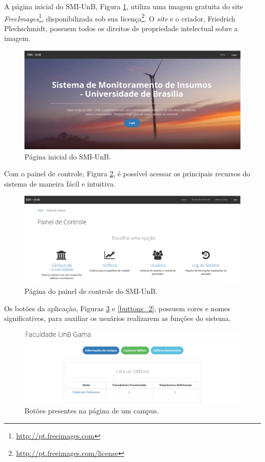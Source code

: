 A página inicial do SMI-UnB, Figura \ref{main_page}, utiliza uma imagem gratuita do site \textit{FreeImages}\footnote{\url{http://pt.freeimages.com}}, disponibilizada sob sua licença\footnote{\url{http://pt.freeimages.com/license}}. O \textit{site} e o criador, Friedrich Plechschmidt, possuem todos os direitos de propriedade intelectual sobre a imagem.

\begin{figure}[!h]
    \centering
    \includegraphics[scale=0.35]{figuras/main_page.eps}
    \caption{Página inicial do SMI-UnB.}
    \label{main_page}
\end{figure}

Com o painel de controle, Figura \ref{dashboard}, é possível acessar os principais recursos do sistema de maneira fácil e intuitiva.

\begin{figure}[!h]
    \centering
    \includegraphics[scale=0.35]{figuras/dashboard.eps}
    \caption{Página do painel de controle do SMI-UnB.}
    \label{dashboard}
\end{figure}

Os botões da aplicação, Figuras \ref{buttons} e \ref{buttons_2}, possuem cores e nomes significativos, para auxiliar os usuários realizarem as funções do sistema.

\begin{figure}[!h]
    \centering
    \includegraphics[scale=0.4]{figuras/buttons.eps}
    \caption{Botões presentes na página de um campus.}
    \label{buttons}
\end{figure}

